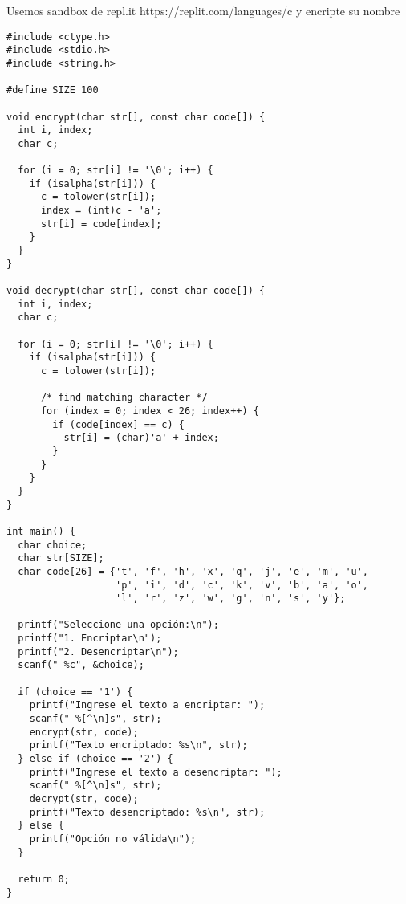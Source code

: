 \begin{tcolorbox}[colback=gray!5!white,colframe=orange!60!gray,title=Actividad] 
Usemos sandbox de repl.it https://replit.com/languages/c y encripte su nombre 
\end{tcolorbox}
\begin{lstlisting}
#include <ctype.h>
#include <stdio.h>
#include <string.h>

#define SIZE 100

void encrypt(char str[], const char code[]) {
  int i, index;
  char c;

  for (i = 0; str[i] != '\0'; i++) {
    if (isalpha(str[i])) {
      c = tolower(str[i]);
      index = (int)c - 'a';
      str[i] = code[index];
    }
  }
}

void decrypt(char str[], const char code[]) {
  int i, index;
  char c;

  for (i = 0; str[i] != '\0'; i++) {
    if (isalpha(str[i])) {
      c = tolower(str[i]);

      /* find matching character */
      for (index = 0; index < 26; index++) {
        if (code[index] == c) {
          str[i] = (char)'a' + index;
        }
      }
    }
  }
}

int main() {
  char choice;
  char str[SIZE];
  char code[26] = {'t', 'f', 'h', 'x', 'q', 'j', 'e', 'm', 'u',
                   'p', 'i', 'd', 'c', 'k', 'v', 'b', 'a', 'o',
                   'l', 'r', 'z', 'w', 'g', 'n', 's', 'y'};

  printf("Seleccione una opción:\n");
  printf("1. Encriptar\n");
  printf("2. Desencriptar\n");
  scanf(" %c", &choice);

  if (choice == '1') {
    printf("Ingrese el texto a encriptar: ");
    scanf(" %[^\n]s", str);
    encrypt(str, code);
    printf("Texto encriptado: %s\n", str);
  } else if (choice == '2') {
    printf("Ingrese el texto a desencriptar: ");
    scanf(" %[^\n]s", str);
    decrypt(str, code);
    printf("Texto desencriptado: %s\n", str);
  } else {
    printf("Opción no válida\n");
  }

  return 0;
}

\end{lstlisting}
